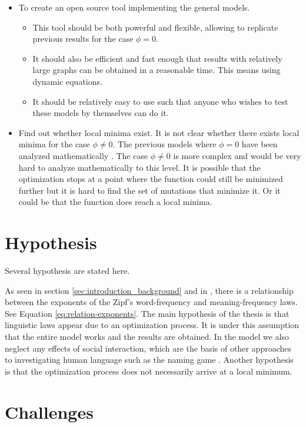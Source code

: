 \begin{itemize}
\item
  To create an open source tool implementing the general models.
  \begin{itemize}
  \item
    This tool should be both powerful and flexible, allowing to replicate previous results for the case $\phi=0$.
  \item
    It should also be efficient and fast enough that results with relatively large graphs can be obtained in a reasonable time. This means using dynamic equations.
  \item
    It should be relatively easy to use such that anyone who wishes to test these models by themselves can do it.
  \end{itemize}
\item
  Find out whether local minima exist.
  It is not clear whether there exists local minima for the case $\phi \neq 0$.
  The previous models where $\phi = 0$ have been analyzed mathematically \cite{Salge2015} \cite{Prokopenko2010}.
  The case $\phi \neq 0$ is more complex and would be very hard to analyze mathematically to this level.
  It is possible that the optimization stops at a point where the function could still be minimized further but it is hard to find the set of mutations that minimize it.
  Or it could be that the function does reach a local minima.
\end{itemize}

\section{Hypothesis}
\label{sec:introduction_hypothesis}

Several hypothesis are stated here.

As seen in section \ref{sec:introduction_background} and in \cite{Ferrer2018a}, there is a relationship between the exponents of the Zipf's word-frequency and meaning-frequency laws.
See Equation \ref{eq:relation-exponents}.
The main hypothesis of the thesis is that linguistic laws appear due to an optimization process.
It is under this assumption that the entire model works and the results are obtained.
In the model we also neglect any effects of social interaction, which are the basis of other approaches to investigating human language such as the naming game \cite{Baronchelli2006}.
Another hypothesis is that the optimization process does not necessarily arrive at a local minimum.

\section{Challenges}
\label{sec:introduction_challenges}

